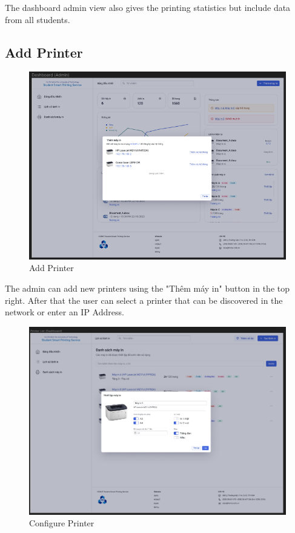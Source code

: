 The dashboard admin view also gives the printing statistics but include data from all students.

\subsection{Add Printer}

\begin{figure}[H]
  \includegraphics[max width=0.9\linewidth]{chapters/5. mvp-wireframe/10. Add Printer.png}
  \caption{Add Printer}%
\end{figure}

The admin can add new printers using the "Thêm máy in" button in the top right. After that the user can select a printer that can be discovered in the network or enter an IP Address.

\begin{figure}[H]
  \includegraphics[max width=0.9\linewidth]{chapters/5. mvp-wireframe/12. Admin Printer Edit.png}
  \caption{Configure Printer}%
\end{figure}

